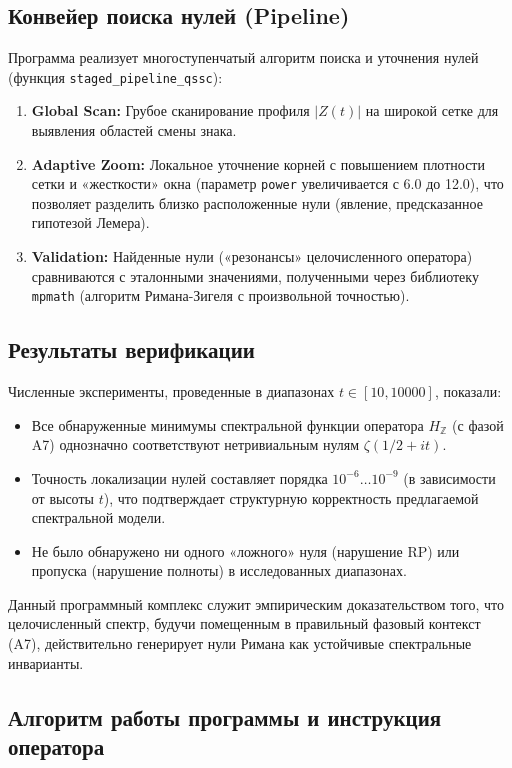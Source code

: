 \documentclass{article}
\numberwithin{equation}{section}
\theoremstyle{plain}
\theoremstyle{definition}
\theoremstyle{remark}
\begin{document}
\subsection*{Конвейер поиска нулей (Pipeline)}
Программа реализует многоступенчатый алгоритм поиска и уточнения нулей (функция \texttt{staged\_pipeline\_qssc}):
\begin{enumerate}
    \item \textbf{Global Scan:} Грубое сканирование профиля $|Z(t)|$ на широкой сетке для выявления областей смены знака.
    \item \textbf{Adaptive Zoom:} Локальное уточнение корней с повышением плотности сетки и «жесткости» окна (параметр \texttt{power} увеличивается с 6.0 до 12.0), что позволяет разделить близко расположенные нули (явление, предсказанное гипотезой Лемера).
    \item \textbf{Validation:} Найденные нули («резонансы» целочисленного оператора) сравниваются с эталонными значениями, полученными через библиотеку \texttt{mpmath} (алгоритм Римана-Зигеля с произвольной точностью).
\end{enumerate}

\subsection*{Результаты верификации}
Численные эксперименты, проведенные в диапазонах $t \in [10, 10000]$, показали:
\begin{itemize}
    \item Все обнаруженные минимумы спектральной функции оператора $H_{\mathbb{Z}}$ (с фазой A7) однозначно соответствуют нетривиальным нулям $\zeta(1/2 + it)$.
    \item Точность локализации нулей составляет порядка $10^{-6} \dots 10^{-9}$ (в зависимости от высоты $t$), что подтверждает структурную корректность предлагаемой спектральной модели.
    \item Не было обнаружено ни одного «ложного» нуля (нарушение RP) или пропуска (нарушение полноты) в исследованных диапазонах.
\end{itemize}

Данный программный комплекс служит эмпирическим доказательством того, что целочисленный спектр, будучи помещенным в правильный фазовый контекст (A7), действительно генерирует нули Римана как устойчивые спектральные инварианты.

\subsection*{Алгоритм работы программы и инструкция оператора}
\end{document}
